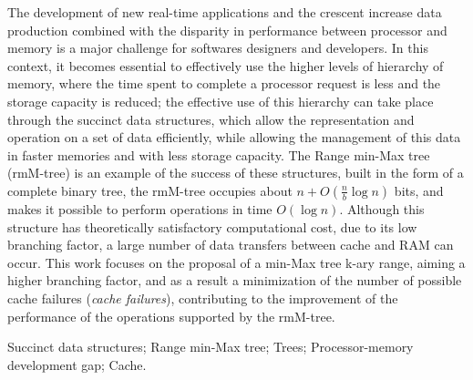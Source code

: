 The development of new real-time applications and the crescent increase data production combined with the disparity in performance between  processor and memory is a major challenge for softwares designers and developers. In this context, it becomes essential to effectively use the higher levels of hierarchy of memory, where the time spent to complete a processor  request is less and the storage capacity is reduced;  the effective use of this hierarchy can take place through the succinct data structures, which allow the representation and operation on a set of data efficiently,  while allowing the management of this data in faster memories and with  less storage capacity. The Range min-Max tree (rmM-tree) is an example of the success of these structures, built in the form of a complete binary tree, the rmM-tree occupies  about $n + O (\frac {n} {b} \log n)$ bits, and makes it possible to perform operations in time $O(\log n)$.  Although this structure has theoretically satisfactory computational cost, due to its low branching factor, a large number of data transfers between  cache and RAM can occur. This work focuses on the proposal of a min-Max tree k-ary range, aiming a higher branching factor, and as a result a minimization of the number of possible cache failures (\textit{cache failures}), contributing to the improvement of the performance of the operations supported by the rmM-tree.

\begin{keywords}
Succinct data structures; Range min-Max tree; Trees; Processor-memory development gap; Cache.
\end{keywords}